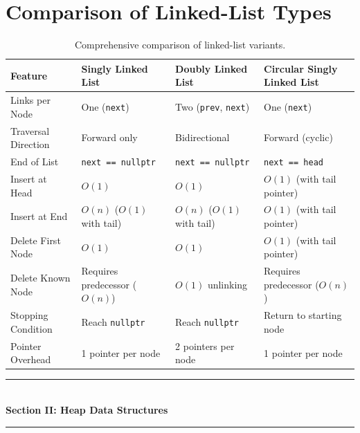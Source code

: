 \section{Comparison of Linked-List Types}

\begin{table}[htbp]
\centering
\small
\begin{tabularx}{\textwidth}{l X X X}
\toprule
\textbf{Feature} & \textbf{Singly Linked List} & \textbf{Doubly Linked List} & \textbf{Circular Singly Linked List} \\
\midrule
Links per Node       & One (\texttt{next})         & Two (\texttt{prev}, \texttt{next}) & One (\texttt{next}) \\
Traversal Direction  & Forward only                & Bidirectional               & Forward (cyclic) \\
End of List          & \texttt{next == nullptr}    & \texttt{next == nullptr}    & \texttt{next == head} \\
Insert at Head       & $O(1)$                      & $O(1)$                      & $O(1)$ (with tail pointer) \\
Insert at End        & $O(n)$ ($O(1)$ with tail)   & $O(n)$ ($O(1)$ with tail)   & $O(1)$ (with tail pointer) \\
Delete First Node    & $O(1)$                      & $O(1)$                      & $O(1)$ (with tail pointer) \\
Delete Known Node    & Requires predecessor ($O(n)$) & $O(1)$ unlinking           & Requires predecessor ($O(n)$) \\
Stopping Condition   & Reach \texttt{nullptr}      & Reach \texttt{nullptr}      & Return to starting node \\
Pointer Overhead     & 1 pointer per node          & 2 pointers per node         & 1 pointer per node \\
\bottomrule
\end{tabularx}
\caption{Comprehensive comparison of linked-list variants.}
\end{table}

\begin{center}
\vspace{1em}
{\color{primary}\rule{0.45\textwidth}{1.2pt}}\\[4pt]
{\Large\bfseries\color{primary} Section II: Heap Data Structures}\\[2pt]
{\color{primary}\rule{0.45\textwidth}{1.2pt}}
\vspace{0.5em}
\end{center}

